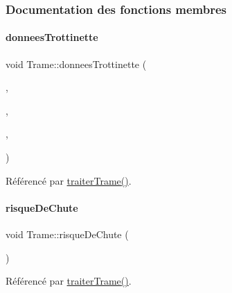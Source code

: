 \subsubsection{Documentation des fonctions membres}
\mbox{\label{class_trame_ae7f5191744273a6bb4347aa477bdfaff}} 
\paragraph{\texorpdfstring{donnees\+Trottinette}{donneesTrottinette}}
{\footnotesize\ttfamily void Trame\+::donnees\+Trottinette (\begin{DoxyParamCaption}\item[{Q\+String}]{,  }\item[{Q\+String}]{,  }\item[{Q\+String}]{,  }\item[{Q\+String}]{ }\end{DoxyParamCaption})\hspace{0.3cm}{\ttfamily [signal]}}



Référencé par \hyperlink{class_trame_af6397dc6452101d13d8cccd53205a937}{traiter\+Trame()}.

\mbox{\label{class_trame_a8286aea8fb78e2e148f3f0dc35e8b079}} 
\paragraph{\texorpdfstring{risque\+De\+Chute}{risqueDeChute}}
{\footnotesize\ttfamily void Trame\+::risque\+De\+Chute (\begin{DoxyParamCaption}\item[{Q\+String}]{ }\end{DoxyParamCaption})\hspace{0.3cm}{\ttfamily [signal]}}



Référencé par \hyperlink{class_trame_af6397dc6452101d13d8cccd53205a937}{traiter\+Trame()}.

\mbox{\label{class_trame_af6397dc6452101d13d8cccd53205a937}} 
